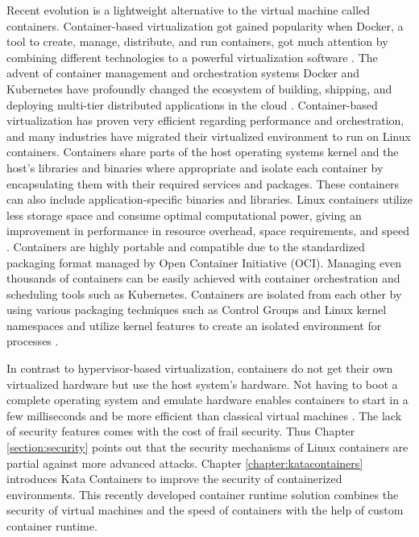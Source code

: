 Recent evolution is a lightweight alternative to the virtual machine called containers. Container-based virtualization got gained popularity when Docker, a tool to create, manage, distribute, and run containers, got much attention by combining different technologies to a powerful virtualization software \cite{Eder2016}. The advent of container management and orchestration systems Docker and Kubernetes have profoundly changed the ecosystem of building, shipping, and deploying multi-tier distributed applications in the cloud \cite{Gao2017}. Container-based virtualization has proven very efficient regarding performance and orchestration, and many industries have migrated their virtualized environment to run on Linux containers. Containers share parts of the host operating systems kernel and the host's libraries and binaries where appropriate and isolate each container by encapsulating them with their required services and packages. These containers can also include application-specific binaries and libraries. Linux containers utilize less storage space and consume optimal computational power, giving an improvement in performance in resource overhead, space requirements, and speed \cite{Toimela2017}\cite{Lingayat2018}. Containers are highly portable and compatible due to the standardized packaging format managed by Open Container Initiative (OCI)\cite{OCI}. Managing even thousands of containers can be easily achieved with container orchestration and scheduling tools such as Kubernetes. Containers are isolated from each other by using various packaging techniques such as Control Groups and Linux kernel namespaces and utilize kernel features to create an isolated environment for processes \cite{Flauzac2020}.

In contrast to hypervisor-based virtualization, containers do not get their own virtualized hardware but use the host system's hardware. Not having to boot a complete operating system and emulate hardware enables containers to start in a few milliseconds and be more efficient than classical virtual machines \cite{Eder2016}. The lack of security features comes with the cost of frail security. Thus Chapter \ref{section:security} points out that the security mechanisms of Linux containers are partial against more advanced attacks. Chapter \ref{chapter:katacontainers} introduces Kata Containers to improve the security of containerized environments. This recently developed container runtime solution combines the security of virtual machines and the speed of containers with the help of custom container runtime.

